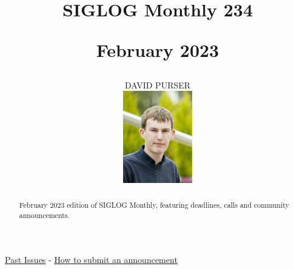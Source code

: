 \documentclass[prodmode,acmtecs]{acmsmall} %
\newcounter{colstart}
\begin{document}
\setcounter{colstart}{\thepage}

\title{{\huge\sc SIGLOG Monthly 234}

 February 2023}
\author{DAVID PURSER
\vspace*{-2.6cm}\begin{flushright}\includegraphics[width=30mm]{dp}\end{flushright}
}

\begin{abstract}
February 2023 edition of SIGLOG Monthly, featuring deadlines, calls and community announcements.
\end{abstract}


\maketitlee

\href{https://lics.siglog.org/newsletters/}{Past Issues}
 - 
\href{https://lics.siglog.org/newsletters/inst.html}{How to submit an announcement}
\end{document}
